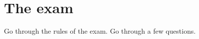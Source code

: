 %
%
%


\section{The exam}

Go through the rules of the exam.
Go through a few questions.




\begin{frame}[allowframebreaks]
  \printbibliography
\end{frame}
